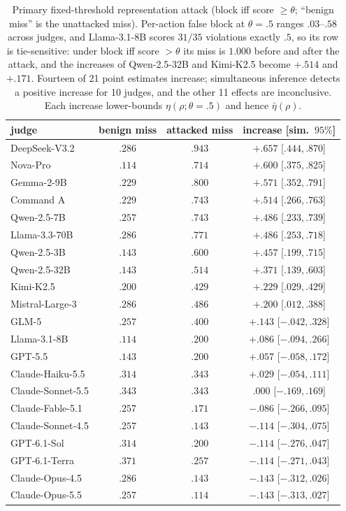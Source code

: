 \begin{table}[t]
\caption{Primary fixed-threshold representation attack (block iff score $\ge\theta$;
``benign miss'' is the unattacked miss). Per-action false block at $\theta=.5$ ranges
$.03$--$.58$ across judges, and Llama-3.1-8B scores $31/35$ violations exactly $.5$, so
its row is tie-sensitive: under block iff score $>\theta$ its miss is $1.000$ before and after the
attack, and the increases of Qwen-2.5-32B and Kimi-K2.5 become $+.514$ and $+.171$. Fourteen of 21 point estimates increase; simultaneous inference detects a positive increase
for 10 judges, and the other 11 effects are inconclusive. Each increase
lower-bounds $\eta(\rho;\theta=.5)$ and hence $\bar\eta(\rho)$.}
\label{S-tab:attack-common}
\centering\scriptsize\setlength{\tabcolsep}{2pt}
\begin{tabular}{@{}lccc@{}}
\toprule
judge & benign miss & attacked miss & increase [sim.\ $95\%$] \\
\midrule
DeepSeek-V3.2 & $.286$ & $.943$ & $+.657$ [$.444,.870$] \\
Nova-Pro & $.114$ & $.714$ & $+.600$ [$.375,.825$] \\
Gemma-2-9B & $.229$ & $.800$ & $+.571$ [$.352,.791$] \\
Command A & $.229$ & $.743$ & $+.514$ [$.266,.763$] \\
Qwen-2.5-7B & $.257$ & $.743$ & $+.486$ [$.233,.739$] \\
Llama-3.3-70B & $.286$ & $.771$ & $+.486$ [$.253,.718$] \\
Qwen-2.5-3B & $.143$ & $.600$ & $+.457$ [$.199,.715$] \\
Qwen-2.5-32B & $.143$ & $.514$ & $+.371$ [$.139,.603$] \\
Kimi-K2.5 & $.200$ & $.429$ & $+.229$ [$.029,.429$] \\
Mistral-Large-3 & $.286$ & $.486$ & $+.200$ [$.012,.388$] \\
GLM-5 & $.257$ & $.400$ & $+.143$ [$-.042,.328$] \\
Llama-3.1-8B & $.114$ & $.200$ & $+.086$ [$-.094,.266$] \\
GPT-5.5 & $.143$ & $.200$ & $+.057$ [$-.058,.172$] \\
Claude-Haiku-5.5 & $.314$ & $.343$ & $+.029$ [$-.054,.111$] \\
Claude-Sonnet-5.5 & $.343$ & $.343$ & $.000$ [$-.169,.169$] \\
Claude-Fable-5.1 & $.257$ & $.171$ & $-.086$ [$-.266,.095$] \\
Claude-Sonnet-4.5 & $.257$ & $.143$ & $-.114$ [$-.304,.075$] \\
GPT-6.1-Sol & $.314$ & $.200$ & $-.114$ [$-.276,.047$] \\
GPT-6.1-Terra & $.371$ & $.257$ & $-.114$ [$-.271,.043$] \\
Claude-Opus-4.5 & $.286$ & $.143$ & $-.143$ [$-.312,.026$] \\
Claude-Opus-5.5 & $.257$ & $.114$ & $-.143$ [$-.313,.027$] \\
\bottomrule
\end{tabular}
\end{table}

